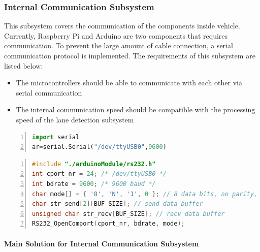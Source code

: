 \documentclass[a4paper,12pt]{article}
\begin{document}
	
	
	\subsubsection{Internal Communication Subsystem}
	This subsystem covers the communication of the components inside vehicle. Currently, Raspberry Pi and Arduino are two components that requires communication. To prevent the large amount of cable connection, a serial communication protocol is implemented. The requirements of this subsystem are listed below:
	\begin{itemize}
		\item The microcontrollers should be able to communicate with each other via serial communication
		\item The internal communication speed should be compatible with the processing speed of the lane detection subsystem  
	\end{itemize}
		\begin{lstlisting}[language=Python,float=t,numbers=left,frame=single,caption=Serial object decleration in Python,label=sc:serial_python, captionpos=b ] 
import serial
ar=serial.Serial("/dev/ttyUSB0",9600)
		\end{lstlisting}
		 \begin{lstlisting}[language=C,float=t,numbers=left,frame=single,caption=Serial communication setup in C,label=sc:serial_c, captionpos=b ] 
#include "./arduinoModule/rs232.h"
int cport_nr = 24; /* /dev/ttyUSB0 */
int bdrate = 9600; /* 9600 baud */
char mode[] = { '8', 'N', '1', 0 }; // 8 data bits, no parity, 1 stop bit
char str_send[2][BUF_SIZE]; // send data buffer
unsigned char str_recv[BUF_SIZE]; // recv data buffer
RS232_OpenComport(cport_nr, bdrate, mode);
		\end{lstlisting}
	\paragraph{Main Solution for Internal Communication Subsystem}
	
\end{document}
